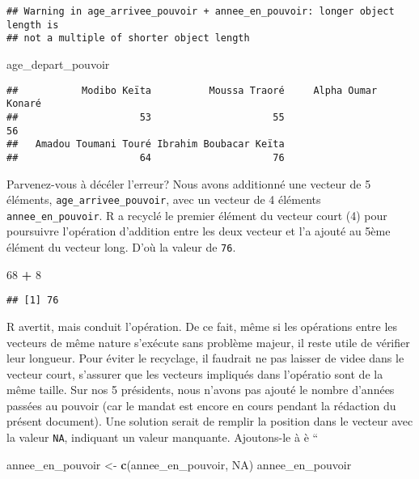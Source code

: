 \documentclass[]{book}
\newenvironment{Shaded}{\begin{snugshade}}{\end{snugshade}}
\newcommand{\KeywordTok}[1]{\textcolor[rgb]{0.13,0.29,0.53}{\textbf{#1}}}
\newcommand{\DecValTok}[1]{\textcolor[rgb]{0.00,0.00,0.81}{#1}}
\newcommand{\StringTok}[1]{\textcolor[rgb]{0.31,0.60,0.02}{#1}}
\newcommand{\OtherTok}[1]{\textcolor[rgb]{0.56,0.35,0.01}{#1}}
\newcommand{\OperatorTok}[1]{\textcolor[rgb]{0.81,0.36,0.00}{\textbf{#1}}}
\newcommand{\NormalTok}[1]{#1}
\begin{document}
\begin{verbatim}
## Warning in age_arrivee_pouvoir + annee_en_pouvoir: longer object length is
## not a multiple of shorter object length
\end{verbatim}

\begin{Shaded}
\begin{Highlighting}[]
\NormalTok{age_depart_pouvoir}
\end{Highlighting}
\end{Shaded}

\begin{verbatim}
##           Modibo Keïta          Moussa Traoré     Alpha Oumar Konaré 
##                     53                     55                     56 
##   Amadou Toumani Touré Ibrahim Boubacar Keïta 
##                     64                     76
\end{verbatim}

Parvenez-vous à décéler l'erreur? Nous avons additionné une vecteur de 5
éléments, \texttt{age\_arrivee\_pouvoir}, avec un vecteur de 4 éléments
\texttt{annee\_en\_pouvoir}. R a recyclé le premier élément du vecteur
court (4) pour poursuivre l'opération d'addition entre les deux vecteur
et l'a ajouté au 5ème élément du vecteur long. D'où la valeur de
\texttt{76}.

\begin{Shaded}
\begin{Highlighting}[]
\DecValTok{68} \OperatorTok{+}\StringTok{ }\DecValTok{8}
\end{Highlighting}
\end{Shaded}

\begin{verbatim}
## [1] 76
\end{verbatim}

R avertit, mais conduit l'opération. De ce fait, même si les opérations
entre les vecteurs de même nature s'exécute sans problème majeur, il
reste utile de vérifier leur longueur. Pour éviter le recyclage, il
faudrait ne pas laisser de videe dans le vecteur court, s'assurer que
les vecteurs impliqués dans l'opératio sont de la même taille. Sur nos 5
présidents, nous n'avons pas ajouté le nombre d'années passées au
pouvoir (car le mandat est encore en cours pendant la rédaction du
présent document). Une solution serait de remplir la position dans le
vecteur avec la valeur \texttt{NA}, indiquant un valeur manquante.
Ajoutons-le à è ``

\begin{Shaded}
\begin{Highlighting}[]
\NormalTok{annee_en_pouvoir <-}\StringTok{ }\KeywordTok{c}\NormalTok{(annee_en_pouvoir, }\OtherTok{NA}\NormalTok{)}
\NormalTok{annee_en_pouvoir}
\end{Highlighting}
\end{Shaded}
\end{document}
